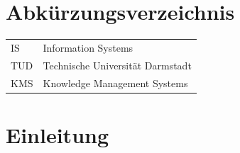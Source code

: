 \documentclass[
	english,
	ruledheaders=section,%
	class=report,%
	thesis={type=bachelor},%
	accentcolor=1b,%
	custommargins=true,%
	marginpar=false,%
	parskip=half-,%
	fontsize=11pt,%
	DIV=14,
]{tudapub}
\begin{document}
\listoffigures
{}           %

\listoftables
{}           %

\chapter*{Abkürzungsverzeichnis}

\begin{xtabular}{ll}
IS					&	Information Systems\\
TUD					&	Technische Universität Darmstadt\\
KMS                 &   Knowledge Management Systems \\

\end{xtabular} 


\onehalfspacing
\chapter{Einleitung}
\setcounter{seitenzahlroemisch}{\value{page}}
\end{document}
